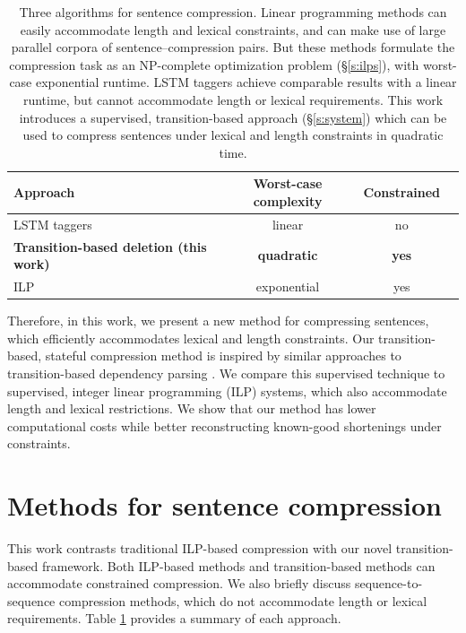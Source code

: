 \documentclass[11pt,a4paper]{article}
\begin{document}
\begin{table}[htb!]
\begin{tabular}{lccc}
\textbf{Approach} & \textbf{Worst-case complexity} & \textbf{Constrained}  \\ \hline
LSTM taggers \cite{filippova2015sentence}   & linear              & no         \\   
\textbf{Transition-based deletion (this work)}  & \textbf{quadratic}     &      \textbf{yes}   \\
ILP    \cite{filippova2013overcoming,Wang2017CanSH}       &   exponential    & yes      \\
\end{tabular}
\caption{Three algorithms for sentence compression. Linear programming methods \cite{clarke2008global,filippova2013overcoming,Wang2017CanSH} can easily accommodate length and lexical constraints, and can make use of large parallel corpora of sentence--compression pairs. But these methods formulate the compression task as an NP-complete optimization problem (\S\ref{s:ilps}), with worst-case exponential runtime. LSTM taggers \cite{filippova2015sentence} achieve comparable results with a linear runtime, but cannot accommodate length or lexical requirements. This work introduces a supervised, transition-based approach (\S\ref{s:system}) which can be used to compress sentences under lexical and length constraints in quadratic time.} 
\label{t:algos}
\end{table}


Therefore, in this work, we present a new method for compressing sentences, which efficiently accommodates lexical and length constraints. Our transition-based, stateful compression method is inspired by similar approaches to transition-based dependency parsing \cite{nivre2003,D14-1082}. We compare this supervised technique to supervised, integer linear programming (ILP) systems, which also accommodate length and lexical restrictions. We show that our method has lower computational costs while better reconstructing known-good shortenings under constraints. 

\section{Methods for sentence compression}

This work contrasts traditional ILP-based compression with our novel transition-based framework. Both ILP-based methods and transition-based methods can accommodate constrained compression. We also briefly discuss sequence-to-sequence compression methods, which do not accommodate length or lexical requirements. Table \ref{t:algos} provides a summary of each approach.
\end{document}
